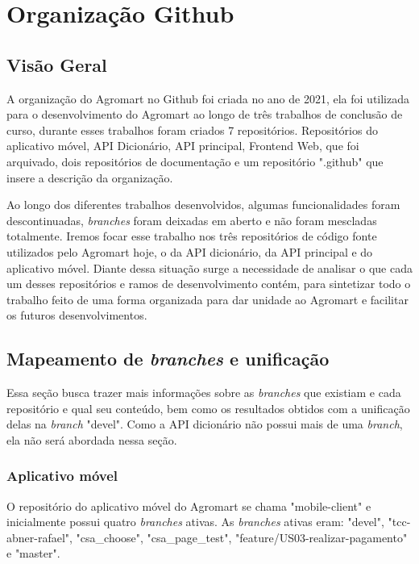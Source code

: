 \chapter[Organização Github]{Organização Github}

\section{Visão Geral}
A organização do Agromart no Github foi criada no ano de 2021, ela foi utilizada para o desenvolvimento do Agromart ao longo de três trabalhos de conclusão de curso, durante esses trabalhos foram criados 7 repositórios. Repositórios do aplicativo móvel, API Dicionário, API principal, Frontend Web, que foi arquivado, dois repositórios de documentação e um repositório ".github" que insere a descrição da organização. 

Ao longo dos diferentes trabalhos desenvolvidos, algumas funcionalidades foram descontinuadas, \textit{branches} foram deixadas em aberto e não foram mescladas totalmente. Iremos focar esse trabalho nos três repositórios de código fonte utilizados pelo Agromart hoje, o da API dicionário, da API principal e do aplicativo móvel. Diante dessa situação surge a necessidade de analisar o que cada um desses repositórios e ramos de desenvolvimento contém, para sintetizar todo o trabalho feito de uma forma organizada para dar unidade ao Agromart e facilitar os futuros desenvolvimentos.

\section{Mapeamento de \textit{branches} e unificação}
Essa seção busca trazer mais informações sobre as \textit{branches} que existiam e cada repositório e qual seu conteúdo, bem como os resultados obtidos com a unificação delas na \textit{branch} "devel". Como a API dicionário não possui mais de uma \textit{branch}, ela não será abordada nessa seção.

\subsection{Aplicativo móvel}
O repositório do aplicativo móvel do Agromart se chama "mobile-client" e inicialmente possui quatro \textit{branches} ativas. As \textit{branches} ativas eram: "devel", "tcc-abner-rafael", "csa\_choose", "csa\_page\_test", "feature/US03-realizar-pagamento" e "master".

